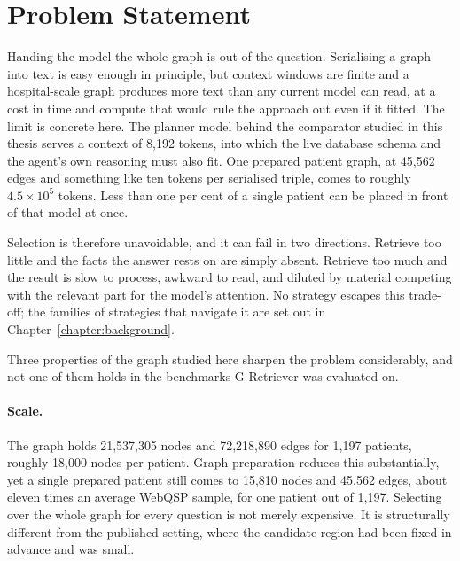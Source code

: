 \section{Problem Statement} \label{sec:problem-statement}

Handing the model the whole graph is out of the question. Serialising a graph
into text is easy enough in principle, but context windows are finite and a
hospital-scale graph produces more text than any current model can read, at a
cost in time and compute that would rule the approach out even if it fitted. The
limit is concrete here. The planner model behind the comparator studied in this
thesis serves a context of 8{,}192 tokens, into which the live database schema
and the agent's own reasoning must also fit. One prepared patient graph, at
45{,}562 edges and something like ten tokens per serialised triple, comes to
roughly $4.5 \times 10^{5}$ tokens. Less than one per cent of a single patient
can be placed in front of that model at once.

Selection is therefore unavoidable, and it can fail in two directions. Retrieve
too little and the facts the answer rests on are simply absent. Retrieve too much
and the result is slow to process, awkward to read, and diluted by material
competing with the relevant part for the model's attention. No strategy escapes
this trade-off; the families of strategies that navigate it are set out in
Chapter~\ref{chapter:background}.

Three properties of the graph studied here sharpen the problem considerably, and
not one of them holds in the benchmarks G-Retriever was evaluated on.

\paragraph{Scale.} The graph holds 21{,}537{,}305 nodes and 72{,}218{,}890 edges
for 1{,}197 patients, roughly 18{,}000 nodes per patient. Graph preparation
reduces this substantially, yet a single prepared patient still comes to
15{,}810 nodes and 45{,}562 edges, about eleven times an average WebQSP sample,
for one patient out of 1{,}197. Selecting over the whole graph for every question
is not merely expensive. It is structurally different from the published setting,
where the candidate region had been fixed in advance and was small.

